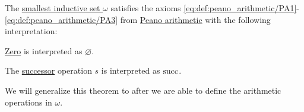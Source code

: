 \begin{theorem}\label{thm:omega_is_model_of_pa_without_operations}
  The \hyperref[thm:smallest_inductive_set_existence]{smallest inductive set \( \omega \)} satisfies the axioms \eqref{eq:def:peano_arithmetic/PA1}-\eqref{eq:def:peano_arithmetic/PA3} from \hyperref[def:peano_arithmetic]{Peano arithmetic} with the following interpretation:
  \begin{thmenum}
     \hyperref[def:peano_arithmetic/zero]{Zero} is interpreted as \( \varnothing \).

     The \hyperref[def:peano_arithmetic/succ]{successor} operation \( s \) is interpreted as \( \operatorname{succ} \).
  \end{thmenum}

  We will generalize this theorem to  after we are able to define the arithmetic operations in \( \omega \).
\end{theorem}
